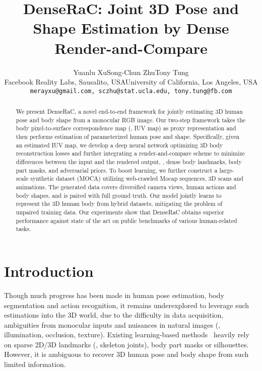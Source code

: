 \documentclass[10pt,twocolumn,letterpaper]{article}
\newcommand{\beforesection}{\vspace{0mm}}
\newcommand{\aftersection}{\vspace{0mm}}
\begin{document}
\title{DenseRaC: Joint 3D Pose and Shape Estimation by Dense Render-and-Compare}

\author{Yuanlu Xu\quad\quad\quad Song-Chun Zhu\quad\quad\quad Tony Tung\\
Facebook Reality Labs, Sausalito, USA\quad\quad University of California, Los Angeles, USA\\
{\tt\small merayxu@gmail.com, sczhu@stat.ucla.edu, tony.tung@fb.com}
}

\maketitle
\ificcvfinal\thispagestyle{empty}\fi

\begin{abstract}

We present DenseRaC, a novel end-to-end framework for jointly estimating 3D human pose and body shape from a monocular RGB image. Our two-step framework takes the body pixel-to-surface correspondence map (\ie, IUV map) as proxy representation and then performs estimation of parameterized human pose and shape.
Specifically, given an estimated IUV map, we develop a deep neural network optimizing 3D body reconstruction losses and further integrating a render-and-compare scheme to minimize differences between the input and the rendered output, \ie, dense body landmarks, body part masks, and adversarial priors.
To boost learning, we further construct a large-scale synthetic dataset (MOCA) utilizing web-crawled Mocap sequences, 3D scans and animations. The generated data covers diversified camera views, human actions and body shapes, and is paired with full ground truth. Our model jointly learns to represent the 3D human body from hybrid datasets, mitigating the problem of unpaired training data. Our experiments show that DenseRaC obtains superior performance against state of the art on public benchmarks of various human-related tasks. 

\end{abstract}

\beforesection
\section{Introduction}
\aftersection

Though much progress has been made in human pose estimation, body segmentation and action recognition, it remains underexplored to leverage such estimations into the 3D world, due to the difficulty in data acquisition, ambiguities from monocular inputs and nuisances in natural images (\eg, illumination, occlusion, texture). Existing learning-based methods~\cite{kanazawa2018hmr,NeuralBodyFit18,varol18_bodynet} heavily rely on sparse 2D/3D landmarks (\ie, skeleton joints), body part masks or silhouettes. However, it is ambiguous to recover 3D human pose and body shape from such limited information.
\end{document}
